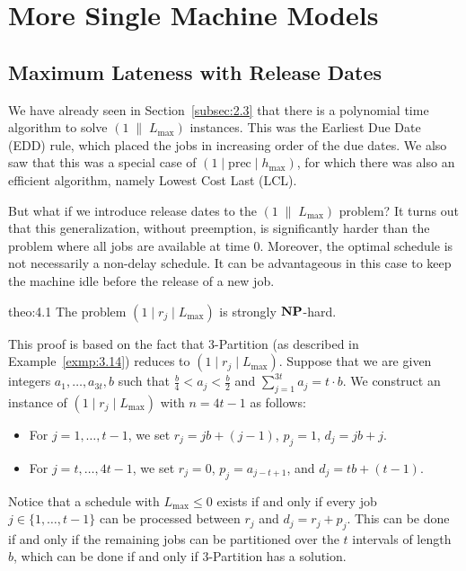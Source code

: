 \section{More Single Machine Models} \label{sec:4}

\subsection{Maximum Lateness with Release Dates} \label{subsec:4.1}
We have already seen in Section~\ref{subsec:2.3} that there is a polynomial 
time algorithm to solve $(1\;\|\;L_{\max})$ instances. This was the 
Earliest Due Date (EDD) rule, which placed the jobs in increasing order of the 
due dates. We also saw that this was a special case of $(1 \mid \text{prec} 
\mid h_{\max})$, for which there was also an efficient algorithm, namely 
Lowest Cost Last (LCL). 

But what if we introduce release dates to the $(1\;\|\;L_{\max})$ problem? 
It turns out that this generalization, without preemption, is significantly 
harder than the problem where all jobs are available at time $0$. Moreover, 
the optimal schedule is not necessarily a non-delay schedule. It can be 
advantageous in this case to keep the machine idle before the release of a 
new job. 

\begin{theo}{theo:4.1}
    The problem $(1 \mid r_j \mid L_{\max})$ is strongly $\operatorname{\textbf{NP}}$-hard. 
\end{theo}
\begin{pf}
    This proof is based on the fact that {\sc $3$-Partition} (as described 
    in Example~\ref{exmp:3.14}) reduces to $(1 \mid r_j \mid L_{\max})$. 
    Suppose that we are given integers $a_1, \dots, a_{3t}, b$ such that 
    $\frac{b}{4} < a_j < \frac{b}{2}$ and $\sum_{j=1}^{3t} a_j = t \cdot b$. 
    We construct an instance of $(1 \mid r_j \mid L_{\max})$ with 
    $n = 4t - 1$ as follows: 
    \begin{itemize}
        \item For $j = 1, \dots, t-1$, we set $r_j = jb + (j-1)$, $p_j = 1$, 
        $d_j = jb + j$. 
        \item For $j = t, \dots, 4t-1$, we set $r_j = 0$, $p_j = a_{j-t+1}$, 
        and $d_j = tb + (t-1)$. 
    \end{itemize}
    Notice that a schedule with $L_{\max} \leq 0$ exists if and only if 
    every job $j \in \{1, \dots, t-1\}$ can be processed between 
    $r_j$ and $d_j = r_j + p_j$. This can be done if and only if the remaining 
    jobs can be partitioned over the $t$ intervals of length $b$, which can be 
    done if and only if {\sc $3$-Partition} has a solution. 
\end{pf}

